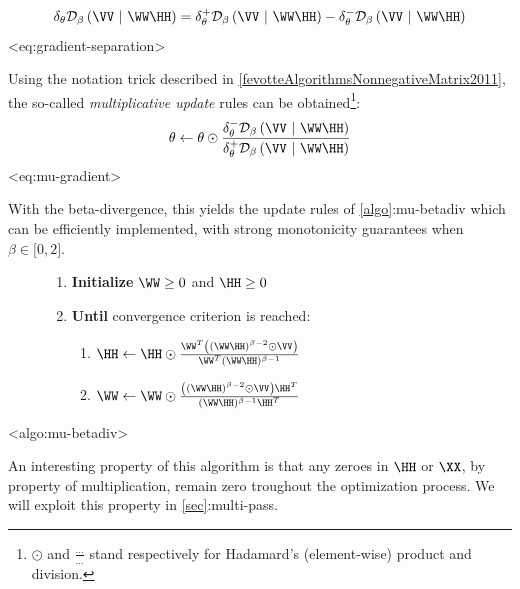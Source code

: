\[\delta_{\mathbf{\mathbf{\theta}}}\mathcal{D}_{\beta}\left( \VV~|~\WW\HH \right) = \delta_{\mathbf{\mathbf{\theta}}}^{+}\mathcal{D}_{\beta}\left( \VV~|~\WW\HH \right) - \delta_{\mathbf{\mathbf{\theta}}}^{-}\mathcal{D}_{\beta}\left( \VV~|~\WW\HH \right)\]
\textless eq:gradient-separation\textgreater{}

Using the notation trick described in
\hyperref[fevotteAlgorithmsNonnegativeMatrix2011]{{[}fevotteAlgorithmsNonnegativeMatrix2011{]}},
the so-called \emph{multiplicative update} rules can be
obtained\footnote{\(\odot\) and \(\frac{\ldots}{\ldots}\) stand
  respectively for Hadamard's (element-wise) product and division.}:
\[\mathbf{\theta} \leftarrow \mathbf{\theta} \odot \frac{\delta_{\mathbf{\mathbf{\theta}}}^{-}\mathcal{D}_{\beta}\left( \VV~|~\WW\HH \right)}{\delta_{\mathbf{\mathbf{\theta}}}^{+}\mathcal{D}_{\beta}\left( \VV~|~\WW\HH \right)}\]
\textless eq:mu-gradient\textgreater{}

With the beta-divergence, this yields the update rules of
\hyperref[algo]{{[}algo{]}}:mu-betadiv which can be efficiently
implemented, with strong monotonicity guarantees when
\(\beta \in \lbrack 0,2\rbrack\).

\begin{figure}
\centering
\begin{minipage}[t]{0.45\linewidth}
\end{minipage}
\hfill
\begin{minipage}[t]{0.45\linewidth}
\begin{enumerate}
\item
  \textbf{Initialize} \(\WW \geq 0\) and
  \(\HH \geq 0\)
\item
  \textbf{Until} convergence criterion is reached:

  \begin{enumerate}
  \item
    \(\HH \leftarrow \HH \odot \frac{\WW^{T}\left( (\WW\HH)^{\beta - 2} \odot \VV \right)}{\WW^{T}(\WW\HH)^{\beta - 1}}\)
  \item
    \(\WW \leftarrow \WW \odot \frac{\left( (\WW\HH)^{\beta - 2} \odot \VV \right)\HH^{T}}{(\WW\HH)^{\beta - 1}\HH^{T}}\)
  \end{enumerate}
\end{enumerate}
\end{minipage}
\caption{}
\end{figure}

\textless algo:mu-betadiv\textgreater{}

An interesting property of this algorithm is that any zeroes in
\(\HH\) or \(\XX\), by property of multiplication, remain
zero troughout the optimization process. We will exploit this property
in \hyperref[sec]{{[}sec{]}}:multi-pass.

